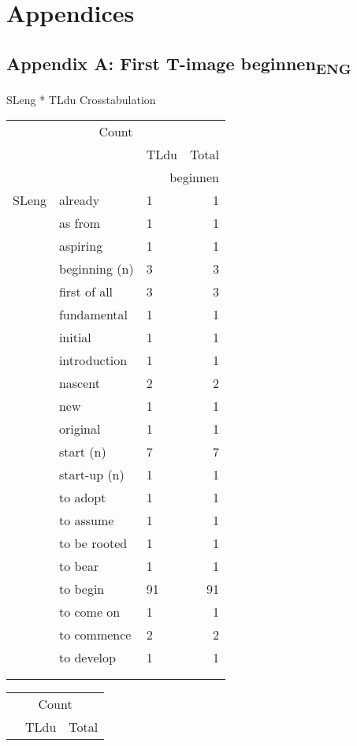 \chapter{Appendices} 

\section*{Appendix A: First T-image beginnen\textsubscript{ENG}}

{ SLeng * TLdu Crosstabulation}\\
{\noindent
\small
\begin{tabularx}{.45\textwidth}{lllr}  
\multicolumn{4}{c}{Count} \\
\multicolumn{2}{c}{} & TLdu & Total\\
\hhline{~~--} & & \multicolumn{2}{r}{beginnen}  \\
\multicolumn{1}{c}{SLeng} & already &  1 &  1\\
& as from &  1 &  1\\
& aspiring &  1 &  1\\
& beginning (n) &  3 &  3\\
& first of all &  3 &  3\\
& fundamental &  1 &  1\\
& initial &  1 &  1\\
& introduction &  1 &  1\\
& nascent &  2 &  2\\
& new &  1 &  1\\
& original &  1 &  1\\
& start (n) &  7 &  7\\
& start-up (n) &  1 &  1\\
& to adopt &  1 &  1\\
& to assume &  1 &  1\\
& to be rooted &  1 &  1\\
& to bear &  1 &  1\\
& to begin &  91 &  91\\
& to come on &  1 &  1\\
& to commence &  2 &  2\\
& to develop &  1 &  1\\
\\
\\
\end{tabularx}
\begin{tabularx}{.45\textwidth}{lllr}   
\multicolumn{4}{c}{Count} \\
\multicolumn{2}{c}{} & TLdu & Total\\

\end{tabularx}}
